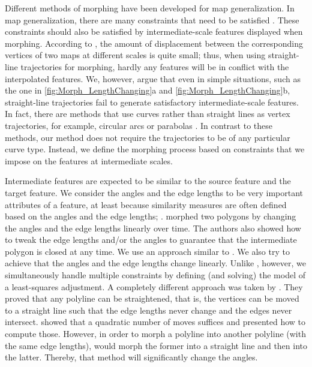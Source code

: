Different methods of morphing 
have been developed for map generalization. 
In map generalization, 
there are many constraints that need to be 
satisfied \parencite{Harrie1999}. 
These constraints should also be satisfied 
by intermediate-scale features displayed when morphing. 
According to \textcite{vanKreveld2001}, 
the amount of displacement 
between the corresponding vertices of two maps 
at different scales is quite small; 
thus, when using straight-line trajectories for morphing, 
hardly any features will be 
in conflict with the interpolated features. 
We, however, argue that even in simple situations, 
such as the one in 
\figs\ref{fig:Morph_LengthChanging}a and 
\ref{fig:Morph_LengthChanging}b, 
straight-line trajectories fail to 
generate satisfactory intermediate-scale features. 
In fact, there are methods that use curves rather than 
straight lines as vertex trajectories, 
for example, circular arcs or parabolas \parencite{Whited2009}. 
In contrast to these methods, our 
method does not require the trajectories to be of any particular 
curve type. 
Instead, we define the morphing process based on constraints 
that we impose on the features at intermediate scales.


Intermediate features are expected to be similar to 
the source feature and the target feature. 
We consider the angles and the edge lengths 
to be very important attributes of a feature, 
at least because similarity measures are often defined 
based on the angles and the edge lengths; 
\parencite[e.g.,][]{Arkin1991,Latecki2000,Frank2006}. 
\textcite{Sederberg1993} morphed two polygons by 
changing the angles and the edge lengths linearly over time. 
The authors also showed how to tweak 
the edge lengths and/or the angles to guarantee that
the intermediate polygon is closed at any time. 
We use an approach similar to \textcite{Sederberg1993}. 
We also try to achieve that 
the angles and the edge lengths change linearly. 
Unlike \textcite{Sederberg1993}, however, 
we simultaneously handle multiple constraints 
by defining (and solving) the model of a 
least-squares adjustment. 
A completely different approach was 
taken by \textcite{Connelly2003}. 
They proved that any polyline can be straightened, that is,
the vertices can be moved to a straight line 
such that the edge lengths never change and 
the edges never intersect. 
\textcite{Streinu2000} showed that 
a quadratic number of moves suffices 
and presented how to compute those. 
However, in order to morph a polyline into another polyline 
(with the same edge lengths), 
\textcite{Streinu2000} would morph the former
into a straight line and then into the latter. 
Thereby, that method will significantly change the angles.

